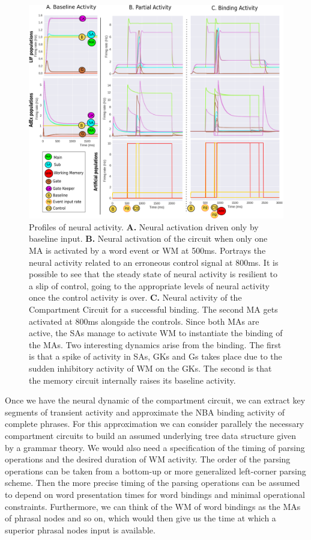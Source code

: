 \documentclass[10pt]{article}
\begin{document}
{\begin{figure}[h!]
  \begin{center}
    \includegraphics[width=0.70\columnwidth]{figures/compartment_circuit_dynamics/compartment_circuit_dynamics}
    \caption{Profiles of neural activity.
      \textbf{A.} Neural activation driven only by baseline input. \textbf{B.} Neural activation of the circuit when only one MA is activated by a word event or WM at 500ms.
      Portrays the neural activity related to an erroneous control signal at 800ms.
      It is possible to see that the steady state of neural activity is resilient to a slip of control, going to the appropriate levels of neural activity once the control activity is over.
      \textbf{C.} Neural activity of the Compartment Circuit for a successful binding.
      The second MA gets activated at 800ms alongside the controls.
      Since both MAs are active, the SAs manage to activate WM to instantiate the binding of the MAs.
      Two interesting dynamics arise from the binding.
      The first is that a spike of activity in SAs, GKs and Gs takes place due to the sudden inhibitory activity of WM on the GKs.
      The second is that the memory circuit internally raises its baseline activity.%
    }

      \label{activity_profiles}
  \end{center}
\end{figure}

Once we have the neural dynamic of the compartment circuit, we can extract key segments of transient activity and approximate the NBA binding activity of complete phrases.
For this approximation we can consider parallely the necessary compartment circuits to build an assumed underlying tree data structure given by a grammar theory.
We would also need a specification of the timing of parsing operations and the desired duration of WM activity.
The order of the parsing operations can be taken from a bottom-up or more generalized left-corner parsing scheme.
Then the more precise timing of the parsing operations can be assumed to depend on word presentation times for word bindings and minimal operational constraints.
Furthermore, we can think of the WM of word bindings as the MAs of phrasal nodes and so on, which would then give us the time at which a superior phrasal nodes input is available.

}
\end{document}
